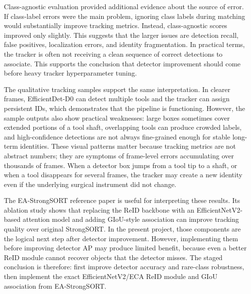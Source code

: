\documentclass[12pt,a4paper]{article}
\begin{document}
Class-agnostic evaluation provided additional evidence about the source of error. If class-label errors were the main problem, ignoring class labels during matching would substantially improve tracking metrics. Instead, class-agnostic scores improved only slightly. This suggests that the larger issues are detection recall, false positives, localization errors, and identity fragmentation. In practical terms, the tracker is often not receiving a clean sequence of correct detections to associate. This supports the conclusion that detector improvement should come before heavy tracker hyperparameter tuning.

The qualitative tracking samples support the same interpretation. In clearer frames, EfficientDet-D0 can detect multiple tools and the tracker can assign persistent IDs, which demonstrates that the pipeline is functioning. However, the sample outputs also show practical weaknesses: large boxes sometimes cover extended portions of a tool shaft, overlapping tools can produce crowded labels, and high-confidence detections are not always fine-grained enough for stable long-term identities. These visual patterns matter because tracking metrics are not abstract numbers; they are symptoms of frame-level errors accumulating over thousands of frames. When a detector box jumps from a tool tip to a shaft, or when a tool disappears for several frames, the tracker may create a new identity even if the underlying surgical instrument did not change.

The EA-StrongSORT reference paper is useful for interpreting these results. Its ablation study shows that replacing the ReID backbone with an EfficientNetV2-based attention model and adding GIoU-style association can improve tracking quality over original StrongSORT. In the present project, those components are the logical next step after detector improvement. However, implementing them before improving detector AP may produce limited benefit, because even a better ReID module cannot recover objects that the detector misses. The staged conclusion is therefore: first improve detector accuracy and rare-class robustness, then implement the exact EfficientNetV2/ECA ReID module and GIoU association from EA-StrongSORT.

\begin{table}[H]\centering\small{}
\caption{Detector comparison.}
\end{table}
\end{document}
